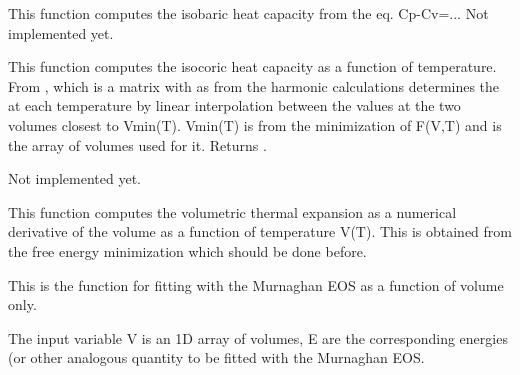 \documentclass[letterpaper,10pt,english]{sphinxmanual}
\begin{document}

\begin{fulllineitems}
\label{pyqha:pyqha.eos.compute_Cp}
This function computes the isobaric heat capacity from the eq. Cp-Cv=...
Not implemented yet.

\end{fulllineitems}


\begin{fulllineitems}
\label{pyqha:pyqha.eos.compute_Cv}
This function computes the isocoric heat capacity as a function of temperature.
From , which is a matrix with  as from the harmonic calculations
determines the  at each temperature by linear interpolation between the values
at the two volumes closest to Vmin(T). Vmin(T) is from the minimization of F(V,T)
and  is the array of volumes used for it.
Returns .

Not implemented yet.

\end{fulllineitems}


\begin{fulllineitems}
\label{pyqha:pyqha.eos.compute_beta}
This function computes the volumetric thermal expansion as a numerical
derivative of the volume as a function of temperature V(T). This is obtained
from the free energy minimization which should be done before.

\end{fulllineitems}


\begin{fulllineitems}
\label{pyqha:pyqha.eos.fit_Murn}
This is the function for fitting with the Murnaghan EOS as a function of volume only.

The input variable V is an 1D array of volumes, E are the corresponding 
energies (or other analogous quantity to be fitted with the Murnaghan EOS.

\end{fulllineitems}
\end{document}
